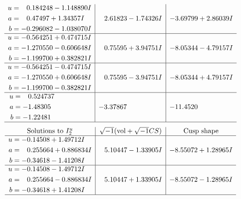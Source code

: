 \documentclass[1p]{elsarticle_modified}
\theoremstyle{definition}
\newcommand{\I}{\sqrt{-1}}
\begin{document}
$$\begin{array}{c|c|c}
\begin{aligned}
u &= \phantom{-}0.184248 - 1.148890 I \\
a &= \phantom{-}0.47497 + 1.34357 I \\
b &= -0.296082 - 1.038070 I\end{aligned}
 & \phantom{-}2.61823 - 1.74326 I & -3.69799 + 2.86039 I \\ \hline\begin{aligned}
u &= -0.564251 + 0.474715 I \\
a &= -1.270550 - 0.606648 I \\
b &= -1.199700 + 0.382821 I\end{aligned}
 & \phantom{-}0.75595 + 3.94751 I & -8.05344 - 4.79157 I \\ \hline\begin{aligned}
u &= -0.564251 - 0.474715 I \\
a &= -1.270550 + 0.606648 I \\
b &= -1.199700 - 0.382821 I\end{aligned}
 & \phantom{-}0.75595 - 3.94751 I & -8.05344 + 4.79157 I \\ \hline\begin{aligned}
u &= \phantom{-}0.524737\phantom{ +0.000000I} \\
a &= -1.48305\phantom{ +0.000000I} \\
b &= -1.22481\phantom{ +0.000000I}\end{aligned}
 & -3.37867\phantom{ +0.000000I} & -11.4520\phantom{ +0.000000I}\\
 \hline 
 \end{array}$$\newpage$$\begin{array}{c|c|c}  
\text{Solutions to }I^u_{2}& \I (\text{vol} + \sqrt{-1}CS) & \text{Cusp shape}\\
 \hline 
\begin{aligned}
u &= -0.14508 + 1.49712 I \\
a &= \phantom{-}0.255664 + 0.886834 I \\
b &= -0.34618 - 1.41208 I\end{aligned}
 & \phantom{-}5.10447 - 1.33905 I & -8.55072 + 1.28965 I \\ \hline\begin{aligned}
u &= -0.14508 - 1.49712 I \\
a &= \phantom{-}0.255664 - 0.886834 I \\
b &= -0.34618 + 1.41208 I\end{aligned}
 & \phantom{-}5.10447 + 1.33905 I & -8.55072 - 1.28965 I\\
 \hline 
 \end{array}$$\newpage\newpage\renewcommand{\arraystretch}{1}
\end{document}
